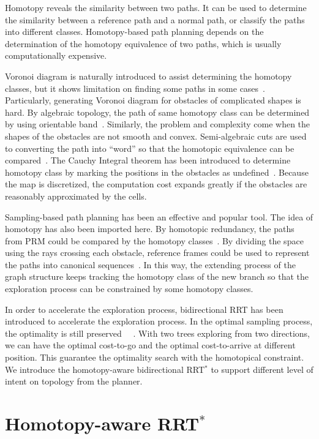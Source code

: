 \documentclass[letterpaper, 10 pt, conference]{ieeeconf}
\begin{document}
Homotopy reveals the similarity between two paths.
It can be used to determine the similarity between a reference path and a normal path, or classify the paths into different classes.
Homotopy-based path planning depends on the determination of the homotopy equivalence of two paths, which is usually computationally expensive.

Voronoi diagram is naturally introduced to assist determining the homotopy classes, but it shows limitation on finding some paths in some cases~\cite{banerjee2013framework}.
Particularly, generating Voronoi diagram for obstacles of complicated shapes is hard.
By algebraic topology, the path of same homotopy class can be determined by using orientable band~\cite{Hershberger199463}.
Similarly, the problem and complexity come when the shapes of the obstacles are not smooth and convex.
Semi-algebraic cuts are used to converting the path into ``word'' so that the homotopic equivalence can be compared~\cite{Grigoriev:1998:PAS:281508.281528}.
The Cauchy Integral theorem has been introduced to determine homotopy class by marking the positions in the obstacles as undefined~\cite{AAAI101920}.
Because the map is discretized, the computation cost expands greatly if the obstacles are reasonably approximated by the cells.

Sampling-based path planning has been an effective and popular tool.
The idea of homotopy has also been imported here.
By homotopic redundancy, the paths from PRM could be compared by the homotopy classes~\cite{1041613}.
By dividing the space using the rays crossing each obstacle, reference frames could be used to represent the paths into canonical sequences~\cite{Hernandez201544}.
In this way, the extending process of the graph structure keeps tracking the homotopy class of the new branch so that the exploration process can be constrained by some homotopy classes.

In order to accelerate the exploration process, bidirectional RRT has been introduced to accelerate the exploration process.
In the optimal sampling process, the optimality is still preserved~
\cite{Jordan.Perez.ea:CSAIL13}~\cite{starek2014bidirectional}.
With two trees exploring from two directions, we can have the optimal cost-to-go and the optimal cost-to-arrive at different position.
This guarantee the optimality search with the homotopical constraint.
We introduce the homotopy-aware bidirectional RRT$^{*}$ to support different level of intent on topology from the planner.

\section{Homotopy-aware RRT$^{*}$}
\label{sec:algorithm}
\end{document}
